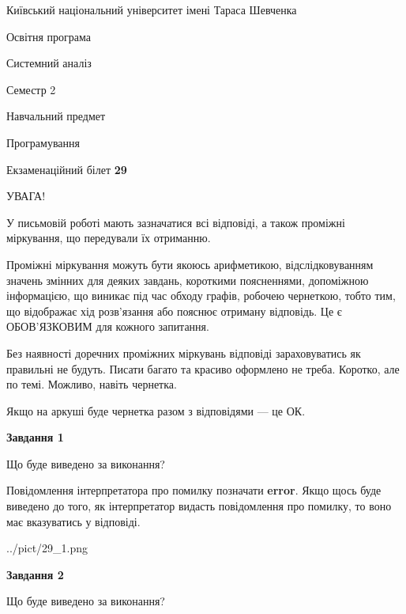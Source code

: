 \documentclass[12pt, ukrainian]{article}
\begin{document}
{{\begin {small}\par
{ \center  Київський національний університет імені Тараса Шевченка \par}
{\parbox {5 cm}{Освітня програма \hfill}{\parbox {7 cm}{Системний аналіз \hfill}}\parbox {6 cm}{\hfill Семестр 2}}\par
{\parbox {5 cm} {Навчальний предмет \hfill}\parbox {7 cm}{Програмування \hfill}\parbox {6cm}{\hfill}\par}\vspace{-7pt} \end{small}}{\center Екзаменаційний білет \No \textbf
{ 29 }\par}}
{
\begin {large}
УВАГА!

У письмовій роботі мають зазначатися всі відповіді, а також проміжні міркування, що передували їх отриманню.

Проміжні міркування можуть бути якоюсь арифметикою, відслідковуванням зна\-чень змінних для деяких завдань,
короткими поясненнями, допоміжною інформацією, що виникає під час обходу графів, робочею чернеткою,
тобто тим, що відображає хід розв’язання або пояснює отриману відповідь.
Це є ОБОВ’ЯЗКОВИМ для кожного запитання.

Без наявності доречних проміжних міркувань відповіді зараховуватись як правиль\-ні не будуть.
Писати багато та красиво оформлено не треба. Коротко, але по темі. Можли\-во, навіть чернетка.

Якщо на аркуші буде чернетка разом з відповідями --- це ОК.

\newpage

{\begin {center}\textbf{Завдання 1}\end {center}}\par
Що буде виведено за виконання?

Повідомлення інтерпретатора про помилку позначати \textbf{error}.
Якщо щось буде виведено до того, як інтерпретатор видасть повідомлення про помилку, 
то воно має вказуватись у відповіді. \par


\begin{center}
	{../pict/29_1.png}
\end{center}
\newpage

{\begin {center}\textbf{Завдання 2}\end {center}}\par
Що буде виведено за виконання?


\end{large}}
\end{document}

